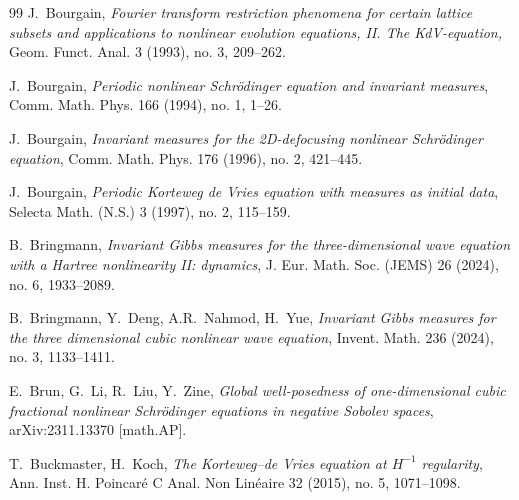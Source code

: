 \documentclass[letterpaper, 11pt,  reqno]{amsart}
\newcommand{\1}{\hspace{0.5mm}\text{I}\hspace{0.5mm}}
\numberwithin{equation}{section}
\numberwithin{theorem}{section}
\begin{document}
\begin{thebibliography}{99}
J.~Bourgain, 
{\it Fourier transform restriction phenomena for certain lattice subsets and applications to nonlinear evolution equations, II. The KdV-equation,} 
 Geom. Funct. Anal. 3 (1993), no. 3, 209--262.


J.~Bourgain,
{\it Periodic nonlinear Schr\"odinger equation and invariant measures},
Comm. Math. Phys. 166 (1994), no. 1, 1--26.


%
%
%


J.~Bourgain,
{\it Invariant measures for the 2D-defocusing nonlinear Schr\"odinger equation},
Comm. Math. Phys. 176 (1996), no. 2, 421--445.

%
J.~Bourgain, 
{\it Periodic Korteweg de Vries equation with measures as initial data}, 
 Selecta Math. (N.S.) 3 (1997), no. 2, 115--159.
%

%
%
%



B.~Bringmann, 
{\it Invariant Gibbs measures for the three-dimensional wave equation with a Hartree nonlinearity II: dynamics},
 J. Eur. Math. Soc. (JEMS) 26 (2024), no. 6, 1933--2089. 







B.~Bringmann, Y.~Deng, A.R.~Nahmod, H.~Yue, 
{\it Invariant Gibbs measures for the three dimensional cubic nonlinear wave equation},
 Invent. Math. 236 (2024), no. 3, 1133--1411. 

%
%


E.~Brun, G.~Li, R.~Liu, Y.~Zine,
{\it  Global well-posedness of one-dimensional cubic fractional nonlinear Schr\"odinger equations in negative Sobolev spaces}, 
 arXiv:2311.13370 [math.AP].



T.~Buckmaster, H.~Koch, 
{\it  The Korteweg--de Vries equation at $H^{-1}$ regularity},
Ann. Inst. H. Poincar\'e C Anal. Non Lin\'eaire 32 (2015), no. 5, 1071--1098.



\end{thebibliography}
\end{document}
